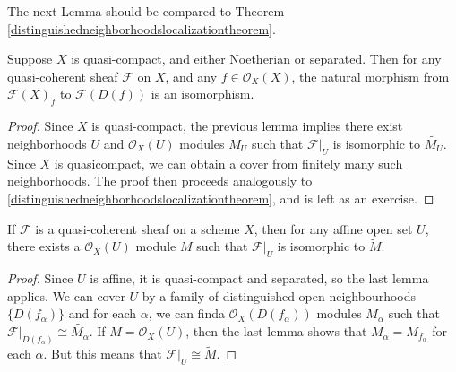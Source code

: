 The next Lemma should be compared to Theorem \ref{distinguishedneighborhoodslocalizationtheorem}.

\begin{lemma}
    Suppose $X$ is quasi-compact, and either Noetherian or separated. Then for any quasi-coherent sheaf $\mathcal{F}$ on $X$, and any $f \in \mathcal{O}_X(X)$, the natural morphism from $\mathcal{F}(X)_f$ to $\mathcal{F}(D(f))$ is an isomorphism.
\end{lemma}
\begin{proof}
    Since $X$ is quasi-compact, the previous lemma implies there exist neighborhoods $U$ and $\mathcal{O}_X(U)$ modules $M_U$ such that $\mathcal{F}|_U$ is isomorphic to $\widetilde{M_U}$. Since $X$ is quasicompact, we can obtain a cover from finitely many such neighborhoods. The proof then proceeds analogously to \ref{distinguishedneighborhoodslocalizationtheorem}, and is left as an exercise.
\end{proof}

\begin{corollary}
    If $\mathcal{F}$ is a quasi-coherent sheaf on a scheme $X$, then for any affine open set $U$, there exists a $\mathcal{O}_X(U)$ module $M$ such that $\mathcal{F}|_U$ is isomorphic to $\widetilde{M}$.
\end{corollary}
\begin{proof}
    Since $U$ is affine, it is quasi-compact and separated, so the last lemma applies. We can cover $U$ by a family of distinguished open neighbourhoods $\{ D(f_\alpha) \}$ and for each $\alpha$, we can finda $\mathcal{O}_X(D(f_\alpha))$ modules $M_\alpha$ such that $\mathcal{F}|_{D(f_\alpha)} \cong \widetilde{M_\alpha}$. If $M = \mathcal{O}_X(U)$, then the last lemma shows that $M_\alpha = M_{f_\alpha}$ for each $\alpha$. But this means that $\mathcal{F}|_U \cong \widetilde{M}$.
\end{proof}


